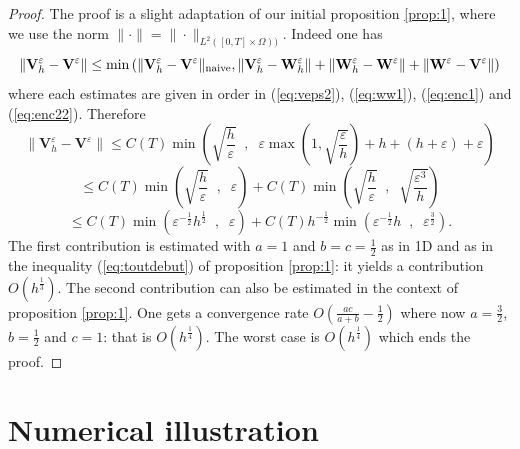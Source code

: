 \documentclass[a4paper,french,english,10pt]{article}
\newcommand\eps{\varepsilon}
\newcommand\V{\mathbf{V}}
\newcommand\W{\mathbf{W}}
\begin{document}
\begin{proof}
The proof is a slight adaptation of our initial proposition
\ref{prop:1}, where we use the norm
$\|\cdot\|=\|\cdot\|_{L^2([0,T]\times\Omega)   ) }$.
Indeed one has
$$
\|\V_h^\eps-\V^\eps\|\leq
\min \left(
\|\V_h^\eps-\V^\eps\|_{\rm naive},
\|\V_h^\eps-\mathbf{W}^\eps_h\|
+
\|\mathbf{W}^\eps_h-\W^\eps\|
+
\|\W^\eps-\V^\eps\|
\right)
$$
where each estimates are given in order in 
(\ref{eq:veps2}), (\ref{eq:ww1}), (\ref{eq:enc1}) and (\ref{eq:enc22}).
Therefore
$$
\|\V_h^\eps-\V^\eps\|\leq
C(T) \min \left(
\sqrt{\frac h \eps  } \; \; , \; \;
\eps \max\left(1, \sqrt{\frac \eps h } \right) +
h + \left(h +\eps
\right)+\eps
\right)
$$
$$
\leq  C(T) \min \left(
\sqrt{\frac h \eps  } \; \; , \; \;
\eps 
\right)+
C(T) \min \left(
\sqrt{\frac h \eps  } \; \; , \; \;
\sqrt{\frac {\eps^3} h }
\right)
$$
$$
\leq
C(T) \min \left(
\eps^{-\frac12   } h^{\frac12  }\; \; , \; \;
\eps 
\right)+C(T) h^{- \frac12  }
 \min \left(
\eps^{-\frac12   } h \; \; , \; \;
\eps^{\frac 32} 
\right).
$$
The first contribution is estimated with
$a=1$ and $b=c=\frac12$ as in 1D and as in the inequality (\ref{eq:toutdebut}) of proposition \ref{prop:1}:
it yields a contribution $O(h^ \frac13 )$.
The second contribution can also be estimated in the context of  proposition \ref{prop:1}.
One gets  a convergence rate  
$O \left( \frac{ac}{a+b}-\frac12 \right)$ where now $a=\frac32$, $b=\frac12$ and $c=1$:
that is $O(h^ \frac14 )$.
The worst case is 
$O(h^ \frac14 )$
which ends the proof.
\end{proof}




\section{Numerical illustration}\label{sec::num}
\end{document}
